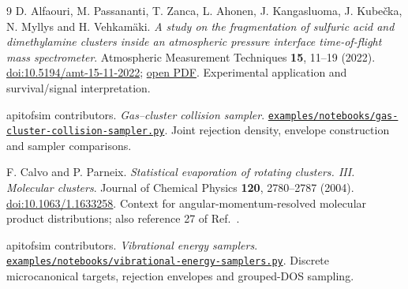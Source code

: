 \documentclass[10pt,a4paper]{article}
\newcommand{\code}[1]{\href{https://github.com/VilmaLab/apitofsim/blob/main/#1}{\nolinkurl{#1}}}
\begin{document}
\begin{thebibliography}{9}
D. Alfaouri, M. Passananti, T. Zanca, L. Ahonen, J. Kangasluoma,
J. Kube\v cka, N. Myllys and H. Vehkam\"aki.
\emph{A study on the fragmentation of sulfuric acid and dimethylamine clusters
inside an atmospheric pressure interface time-of-flight mass spectrometer}.
Atmospheric Measurement Techniques \textbf{15}, 11--19 (2022).
\href{https://doi.org/10.5194/amt-15-11-2022}{doi:10.5194/amt-15-11-2022};
\href{https://amt.copernicus.org/articles/15/11/2022/amt-15-11-2022.pdf}{open PDF}.
Experimental application and survival/signal interpretation.

apitofsim contributors. \emph{Gas--cluster collision sampler}.
\code{examples/notebooks/gas-cluster-collision-sampler.py}.
Joint rejection density, envelope construction and sampler comparisons.

F. Calvo and P. Parneix.
\emph{Statistical evaporation of rotating clusters. III. Molecular clusters}.
Journal of Chemical Physics \textbf{120}, 2780--2787 (2004).
\href{https://doi.org/10.1063/1.1633258}{doi:10.1063/1.1633258}.
Context for angular-momentum-resolved molecular product distributions;
also reference 27 of Ref.~\cite{zapadinsky}.

apitofsim contributors. \emph{Vibrational energy samplers}.
\code{examples/notebooks/vibrational-energy-samplers.py}.
Discrete microcanonical targets, rejection envelopes and grouped-DOS sampling.
\end{thebibliography}
\end{document}
